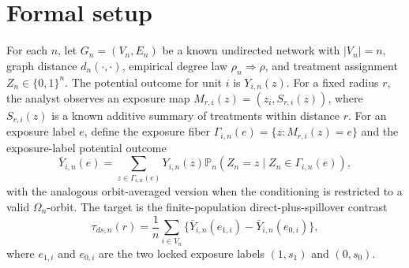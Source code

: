 \documentclass[11pt]{article}
\renewcommand{\Pr}{\mathbb{P}}
\theoremstyle{definition}
\theoremstyle{plain}
\theoremstyle{remark}
\begin{document}
\section{Formal setup}
For each \(n\), let \(G_n=(V_n,E_n)\) be a known undirected network with
\(|V_n|=n\), graph distance \(d_n(\cdot,\cdot)\), empirical degree law
\(\rho_n\Rightarrow\rho\), and treatment assignment \(Z_n\in\{0,1\}^n\).
The potential outcome for unit \(i\) is \(Y_{i,n}(z)\).  For a fixed radius
\(r\), the analyst observes an exposure map \(M_{r,i}(z)=(z_i,S_{r,i}(z))\),
where \(S_{r,i}(z)\) is a known additive summary of treatments within
distance \(r\).  For an exposure label \(e\), define the exposure fiber
\(\Gamma_{i,n}(e)=\{z:M_{r,i}(z)=e\}\) and the exposure-label potential outcome
\[
  \bar Y_{i,n}(e)=
  \sum_{z\in\Gamma_{i,n}(e)}
  Y_{i,n}(z)\Pr_n(Z_n=z\mid Z_n\in\Gamma_{i,n}(e)),
\]
with the analogous orbit-averaged version when the conditioning is restricted
to a valid \(\Omega_n\)-orbit.  The target is the finite-population
direct-plus-spillover contrast
\[
  \tau_{ds,n}(r)=
  \frac1n \sum_{i\in V_n}
  \{\bar Y_{i,n}(e_{1,i})-\bar Y_{i,n}(e_{0,i})\},
\]
where \(e_{1,i}\) and \(e_{0,i}\) are the two locked exposure labels
\((1,s_1)\) and \((0,s_0)\).
\end{document}
